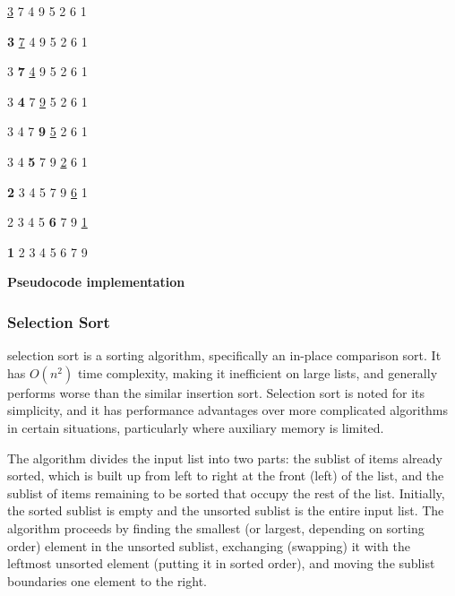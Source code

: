 \documentclass[12pt,a4paper]{book}
\begin{document}
\begin{center}
\par \underline{3} 7 4 9 5 2 6 1 \\

\par \textbf{3} \underline{7} 4 9 5 2 6 1 \\
 
\par 3 \textbf{7} \underline{4} 9 5 2 6 1 \\

\par 3 \textbf{4} 7 \underline{9} 5 2 6 1 \\

\par 3 4 7 \textbf{9} \underline{5} 2 6 1 \\
 
\par 3 4 \textbf{5} 7 9 \underline{2} 6 1 \\
 
\par \textbf{2} 3 4 5 7 9 \underline{6} 1 \\
 
\par 2 3 4 5 \textbf{6} 7 9 \underline{1} \\

\par \textbf{1} 2 3 4 5 6 7 9 \par 
\end{center}
\textbf{Pseudocode implementation}

\subsubsection{Selection Sort}
selection sort is a sorting algorithm, specifically an in-place comparison sort. It has $O(n^2)$ time complexity, making it inefficient on large lists, and generally performs worse than the similar insertion sort. Selection sort is noted for its simplicity, and it has performance advantages over more complicated algorithms in certain situations, particularly where auxiliary memory is limited.
\par 
The algorithm divides the input list into two parts: the sublist of items already sorted, which is built up from left to right at the front (left) of the list, and the sublist of items remaining to be sorted that occupy the rest of the list. Initially, the sorted sublist is empty and the unsorted sublist is the entire input list. The algorithm proceeds by finding the smallest (or largest, depending on sorting order) element in the unsorted sublist, exchanging (swapping) it with the leftmost unsorted element (putting it in sorted order), and moving the sublist boundaries one element to the right.\\
\end{document}
